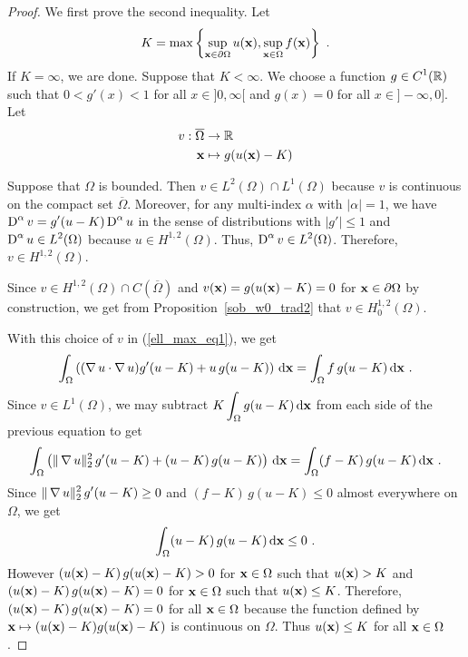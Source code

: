 \begin{proof}
 We first prove the second inequality.  Let
\[
K = \max\left\{ \sup_{\mathbf{x}\in \partial \Omega} u(\mathbf{x}),
\sup_{\mathbf{x}\in \Omega} f(\mathbf{x}) \right\} \ .
\]
If $K=\infty$, we are done.  Suppose that $K<\infty$.
We choose a function $\displaystyle g\in C^1(\mathbb{R})$ such that
$0< g'(x) < 1$ for all $x\in ]0,\infty[$ and $g(x)=0$ for all
$x\in]-\infty,0]$.  Let
\begin{align*}
v: \overline{\Omega} & \rightarrow \mathbb{R} \\
\mathbf{x} &\mapsto g(u(\mathbf{x})-K)
\end{align*}

Suppose that $\Omega$ is bounded.  Then
$\displaystyle v \in L^2(\Omega) \cap L^1(\Omega)$ because
$v$ is continuous on the compact set $\overline{\Omega}$.  Moreover,
for any multi-index $\alpha$ with $|\alpha|=1$, we have
$\displaystyle \operatorname{D}^\alpha v = g'(u-K) \operatorname{D}^\alpha u$ in the sense
of distributions with $|g'|\leq 1$ and
$\displaystyle \operatorname{D}^\alpha u\in L^2(\Omega)$
because $\displaystyle u \in H^{1,2}(\Omega)$.  Thus,
$\displaystyle \operatorname{D}^\alpha v \in L^2(\Omega)$.
Therefore, $\displaystyle v\in H^{1,2}(\Omega)$.

Since $\displaystyle v\in H^{1,2}(\Omega) \cap C(\overline{\Omega})$ and
$v(\mathbf{x}) = g(u(\mathbf{x})-K) = 0$ for $\mathbf{x}\in \partial \Omega$ by
construction, we get from Proposition~\ref{sob_w0_trad2} that
$\displaystyle v\in H^{1,2}_0(\Omega)$.

With this choice of $v$ in (\ref{ell_max_eq1}), we get
\[
\int_\Omega \left( (\operatorname{\nabla} u \cdot \operatorname{\nabla} u ) g'(u-K) 
+ u \, g(u-K) \right) \,\mathrm{d}{\mathbf{x}} = \int_\Omega f\,g(u-K)
\,\mathrm{d}{\mathbf{x}} \ .
\]
Since $\displaystyle v \in L^1(\Omega)$, we may subtract
$\displaystyle K \int_{\Omega} g(u-K) \,\mathrm{d}{\mathbf{x}}$ from each side of
the previous equation to get
\[
\int_\Omega \left( \|\operatorname{\nabla} u \|_2^2\, g'(u-K) 
+ (u-K) \, g(u-K) \right) \,\mathrm{d}{\mathbf{x}} = \int_\Omega (f-K)\,g(u-K)
\,\mathrm{d}{\mathbf{x}} \ .
\]
Since $\displaystyle \|\operatorname{\nabla} u \|_2^2\, g'(u-K)\geq 0$ and
$(f-K) \, g(u-K)\leq 0$ almost everywhere on $\Omega$, we get
\[
\int_\Omega (u-K) \, g(u-K) \,\mathrm{d}{\mathbf{x}} \leq 0 \ .
\]
However $(u(\mathbf{x})-K) \, g(u(\mathbf{x})-K) > 0$ for
$\mathbf{x} \in \Omega$ such that $u(\mathbf{x})>K$ and
$(u(\mathbf{x})-K) \, g(u(\mathbf{x})-K) = 0$ for
$\mathbf{x} \in \Omega$ such that $u(\mathbf{x})\leq K$.  Therefore,
$(u(\mathbf{x})-K) \, g(u(\mathbf{x})-K) = 0$ for all $\mathbf{x}\in \Omega$
because the function defined by
$\mathbf{x} \mapsto (u(\mathbf{x}) - K) g(u(\mathbf{x}) -K)$ is
continuous on $\Omega$.
Thus $u(\mathbf{x}) \leq K$ for all $\mathbf{x}\in \Omega$.


\end{proof}
